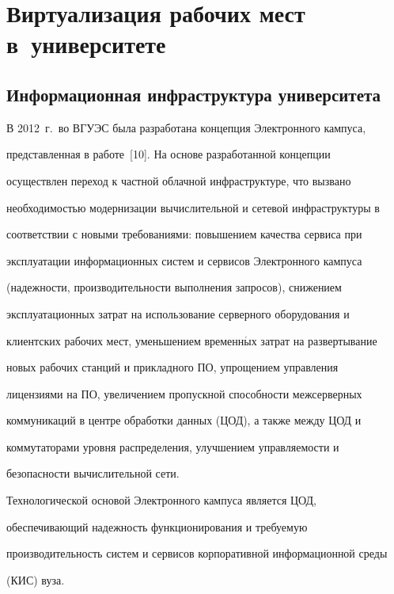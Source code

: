 \section{Виртуализация рабочих мест в~университете}







\subsection{Информационная инфраструктура университета}

  

  В 2012~г.\ во ВГУЭС была разработана концепция Электронного кампуса, 

представленная в работе~[10]. На основе разработанной концепции 

осуществлен переход к частной облачной инфраструктуре, что вызвано 

необходимостью модернизации вычислительной и сетевой инфраструктуры в 

соответствии с новыми требованиями: повышением качества сервиса при 

эксплуатации информационных систем и сервисов Электронного кампуса 

(надежности, производительности выполнения запросов), снижением 

эксплуатационных затрат на использование серверного оборудования и 

клиентских рабочих мест, уменьшением временн$\acute{\mbox{ы}}$х затрат на развертывание 

новых рабочих станций и прикладного ПО, упрощением управ\-ле\-ния 

лицензиями на ПО, увеличением пропускной способности межсерверных 

коммуникаций в центре обработки данных (ЦОД), а также между ЦОД и 

коммутаторами уровня распределения, улучшением управляемости и 

безопасности вычислительной сети.

  

  Технологической основой Электронного кампуса является ЦОД, 

обеспечивающий надежность функционирования и требуемую 

производительность систем и сервисов корпоративной информационной среды 

(КИС) вуза. 

